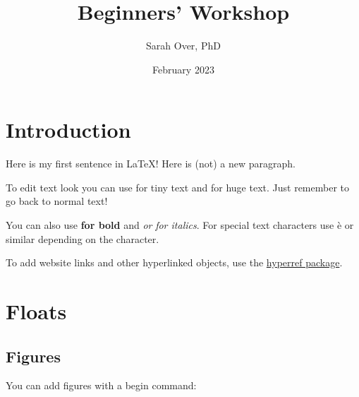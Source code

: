 \documentclass{article}  %
\title{Beginners' Workshop}
\author{Sarah Over, PhD}
\date{February 2023}
\begin{document}

\maketitle  %


\section{Introduction} %

Here is my first sentence in \LaTeX!
Here is (not) a new paragraph. %

To edit text look you can use \tiny for tiny text \normalsize and \huge for huge text. \normalsize Just remember to go back to normal text! %

You can also use \textbf{for bold} and \textit{or} \emph{for italics}. For special text characters use \`e or similar depending on the character.

To add website links and other hyperlinked objects, use the \href{https://ctan.org/pkg/hyperref}{hyperref package}.


\section{Floats} %

\subsection{Figures} %
You can add figures with a begin command:
\end{document}
